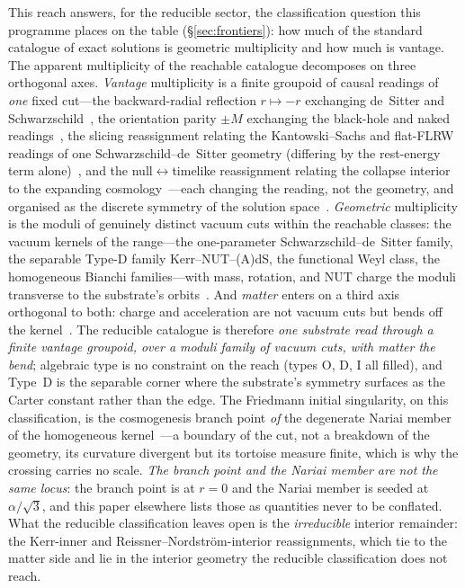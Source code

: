 \documentclass[11pt,a4paper]{article}
\theoremstyle{plain}
\theoremstyle{definition}
\theoremstyle{remark}
\begin{document}
This reach answers, for the reducible sector, the classification question this programme places on the table (\S\ref{sec:frontiers}): how much of the standard catalogue of exact solutions is geometric multiplicity and how much is vantage. The apparent multiplicity of the reachable catalogue decomposes on three orthogonal axes. \emph{Vantage} multiplicity is a finite groupoid of causal readings of \emph{one} fixed cut---the backward-radial reflection $r\mapsto-r$ exchanging de~Sitter and Schwarzschild~\cite{JanzenSlicing,JanzenGroupoid}, the orientation parity $\pm M$ exchanging the black-hole and naked readings~\cite{JanzenAlgebroid}, the slicing reassignment relating the Kantowski--Sachs and flat-FLRW readings of one Schwarzschild--de~Sitter geometry (differing by the rest-energy term alone)~\cite{JanzenRange}, and the null$\leftrightarrow$timelike reassignment relating the collapse interior to the expanding cosmology~\cite{JanzenCRcosmology}---each changing the reading, not the geometry, and organised as the discrete symmetry of the solution space~\cite{JanzenGroupoid}. \emph{Geometric} multiplicity is the moduli of genuinely distinct vacuum cuts within the reachable classes: the vacuum kernels of the range---the one-parameter Schwarzschild--de~Sitter family, the separable Type-D family Kerr--NUT--(A)dS, the functional Weyl class, the homogeneous Bianchi families---with mass, rotation, and NUT charge the moduli transverse to the substrate's orbits~\cite{JanzenRange,JanzenAlgebroid}. And \emph{matter} enters on a third axis orthogonal to both: charge and acceleration are not vacuum cuts but bends off the kernel~\cite{JanzenRange}. The reducible catalogue is therefore \emph{one substrate read through a finite vantage groupoid, over a moduli family of vacuum cuts, with matter the bend}; algebraic type is no constraint on the reach (types O, D, I all filled), and Type~D is the separable corner where the substrate's symmetry surfaces as the Carter constant rather than the edge. The Friedmann initial singularity, on this classification, is the cosmogenesis branch point \emph{of} the degenerate Nariai member of the homogeneous kernel~\cite{JanzenRange}---a boundary of the cut, not a breakdown of the geometry, its curvature divergent but its tortoise measure finite, which is why the crossing carries no scale. \emph{The branch point and the Nariai member are not the same locus}: the branch point is at $r=0$ and the Nariai member is seeded at $\alpha/\sqrt3$, and this paper elsewhere lists those as quantities never to be conflated. What the reducible classification leaves open is the \emph{irreducible} interior remainder: the Kerr-inner and Reissner--Nordstr\"om-interior reassignments, which tie to the matter side and lie in the interior geometry the reducible classification does not reach.
\end{document}
